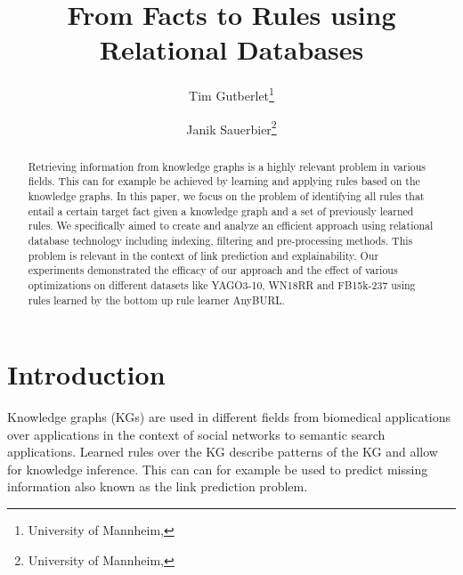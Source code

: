 \documentclass[english]{lni}
\begin{document}
\title[From Facts to Rules using Relational Databases]{From Facts to Rules using Relational Databases}
\author[Tim Gutberlet \and Janik Sauerbier]
{Tim Gutberlet\footnote{University of Mannheim, } \and
Janik Sauerbier\footnote{University of Mannheim, }}
\maketitle

\begin{abstract}
 Retrieving information from knowledge graphs is a highly relevant problem in various fields. This can for example be achieved by learning and applying rules based on the knowledge graphs. In this paper, we focus on the problem of identifying all rules that entail a certain target fact given a knowledge graph and a set of previously learned rules. We specifically aimed to create and analyze an efficient approach using relational database technology including indexing, filtering and pre-processing methods. This problem is relevant in the context of link prediction and explainability. Our experiments demonstrated the efficacy of our approach and the effect of various optimizations on different datasets like YAGO3-10, WN18RR and FB15k-237 using rules learned by the bottom up rule learner AnyBURL. 
\end{abstract}
\section{Introduction}
Knowledge graphs (KGs) are used in different fields from biomedical applications \cite{OpenBioLink} over applications in the context of social networks \cite{SocialNetworks} to semantic search applications\cite{SemanticSearch}. Learned rules over the KG describe patterns of the KG and allow for knowledge inference. This can can for example be used to predict missing information also known as the link prediction problem.
\end{document}
